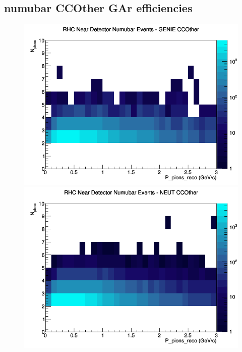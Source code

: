 \documentclass[12pt]{article}
\begin{document}
\subsection{numubar CCOther GAr efficiencies}
\begin{figure}[h]
\includegraphics[width=\linewidth]{eff_N_P/GAr/pions/CCOther_RHC_ND_numubar_N_P_GENIE.png}
\endminipage
{}
\includegraphics[width=\linewidth]{eff_N_P/GAr/pions/CCOther_RHC_ND_numubar_N_P_NEUT.png}
\endminipage
{}

\end{figure}
\end{document}

